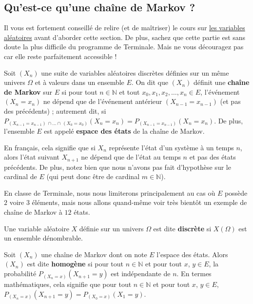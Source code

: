 	\subsection{Qu'est-ce qu'une chaîne de Markov ?}
	
	Il vous est fortement conseillé de relire (et de maîtriser) le cours sur \href{https://bacomathiqu.es/cours/terminale/variables-aleatoires-concentration-grands-nombres/}{les variables aléatoires} avant d'aborder cette section. De plus, sachez que cette partie est sans doute la plus difficile du programme de Terminale. Mais ne vous découragez pas car elle reste parfaitement accessible !
	
	\begin{formula}[Définition]
		Soit $(X_n)$ une suite de variables aléatoires discrètes définies sur un même univers $\Omega$ et à valeurs dans un ensemble $E$. On dit que $(X_n)$ définit une \textbf{chaîne de Markov} sur $E$ si pour tout $n \in \mathbb{N}$ et tout $x_0, x_1, x_2, \dots, x_n \in E$, l'événement $(X_n = x_n)$ ne dépend que de l'événement antérieur $(X_{n-1} = x_{n-1})$ (et pas des précédents) ; autrement dit, si $P_{(X_{n-1} = x_{n-1}) \, \cap \dots \cap \, (X_0 = x_0)}(X_n = x_n) = P_{(X_{n-1} = x_{n-1})}(X_n = x_n)$.
		\newpar
		De plus, l'ensemble $E$ est appelé \textbf{espace des états} de la chaîne de Markov.
	\end{formula}
	
	En français, cela signifie que si $X_n$ représente l'état d'un système à un temps $n$, alors l'état suivant $X_{n+1}$ ne dépend que de l'état au temps $n$ et pas des états précédents.
	De plus, notez bien que nous n'avons pas fait d'hypothèse sur le cardinal de $E$ (qui peut donc être de cardinal $m \in \mathbb{N}$).
	\begin{nosummary}
		\newpar
		En classe de Terminale, nous nous limiterons principalement au cas où $E$ possède $2$ voire $3$ éléments, mais nous allons quand-même voir très bientôt un exemple de chaîne de Markov à $12$ états.
	\end{nosummary}
	
	\begin{tip}
		Une variable aléatoire $X$ définie sur un univers $\Omega$ est dite \textbf{discrète} si $X(\Omega)$ est un ensemble dénombrable.
	\end{tip}
	
	\begin{formula}
		Soit $(X_n)$ une chaîne de Markov dont on note $E$ l'espace des états. Alors $(X_n)$ est dite \textbf{homogène} si pour tout $n \in \mathbb{N}$ et pour tout $x$, $y \in E$, la probabilité $P_{(X_n = x)}(X_{n+1} = y)$ est indépendante de $n$.
		\newpar
		En termes mathématiques, cela signifie que pour tout $n \in \mathbb{N}$ et pour tout $x$, $y \in E$, $P_{(X_n = x)}(X_{n+1} = y) = P_{(X_0 = x)}(X_1 = y)$.
	\end{formula}
	

